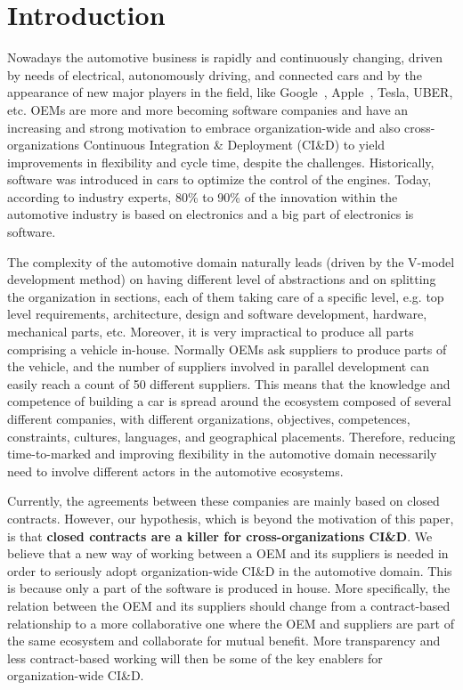 \section{Introduction}\label{sec:intro}


Nowadays the automotive business is rapidly and continuously changing, driven by needs of 
electrical, autonomously driving, and connected cars and by the appearance of new major players in
the field, like Google~\cite{Google}, Apple~\cite{Apple,Apple2}, Tesla, UBER, etc.
OEMs are more and more becoming software companies 
and have an increasing and strong motivation
to embrace organization-wide and also cross-organizations Continuous Integration \& Deployment (CI\&D) to yield improvements
in flexibility and cycle time, despite the challenges.
Historically, software was introduced in cars
to optimize the control of the engines. 
Today, according to industry experts, 80\%
to 90\% of the innovation within the automotive industry is
based on electronics and a big part of electronics is software. 

The complexity of the automotive domain naturally leads (driven by the V-model development method) on having different level of abstractions and on splitting the organization in sections, each of them taking care of a specific level, e.g. top level requirements,
architecture, design and software development, hardware, mechanical parts, etc. 
Moreover, it is very impractical to produce all parts comprising a vehicle in-house. Normally OEMs 
ask suppliers to produce parts of the vehicle, and the number of suppliers involved in parallel development can easily
reach a count of 50 different suppliers. 
This means that the knowledge and competence of building a car is spread around the ecosystem composed of several different companies, with different organizations, objectives, competences, constraints, cultures, languages, and geographical placements. 
Therefore, reducing time-to-marked and improving flexibility in the automotive domain necessarily need to involve different actors in the automotive ecosystems.

Currently, the agreements between these companies are mainly based on closed contracts. 
However, our hypothesis, which is beyond the motivation of this paper, is that {\bf closed contracts are a killer for cross-organizations CI\&D}.
We believe that a new way of working between a OEM and its
suppliers is needed in order to seriously adopt organization-wide CI\&D in the automotive domain. This is because only a part of the software is produced in house.
More specifically, the relation between the OEM and its suppliers should change from a contract-based relationship to a more
collaborative one where the OEM and suppliers are part
of the same ecosystem and collaborate for mutual benefit.
More transparency and less contract-based working will then
be some of the key enablers for organization-wide CI\&D.

